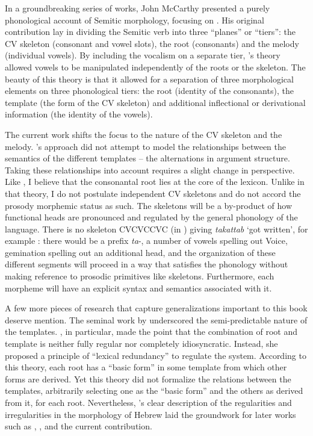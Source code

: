 \begin{exe}
\begin{xlist}
\begin{exe}
\begin{exe}
\begin{exe}
\begin{exe}
\begin{xlist}
\begin{exe}
\begin{xlist}
\begin{xlist}
\begin{xlist}
\begin{exe}
\begin{xlist}
In a groundbreaking series of works, John McCarthy presented a purely phonological account of Semitic morphology, focusing on  \citep{jjmcc79,jjmcc81,jjmcc89li,jjmccprince90}. His original contribution lay in dividing the Semitic verb into three ``planes'' or ``tiers'': the CV skeleton (consonant and vowel slots), the root (consonants) and the melody (individual vowels).
By including the vocalism on a separate tier, \citeauthor{jjmcc81}'s theory allowed vowels to be manipulated independently of the roots or the skeleton.
The beauty of this theory is that it allowed for a separation of three morphological elements on three phonological tiers: the root (identity of the consonants), the template (the form of the CV skeleton) and additional inflectional or derivational information (the identity of the vowels).

The current work shifts the focus to the nature of the CV skeleton and the melody. \citeauthor{jjmcc81}'s approach did not attempt to model the relationships between the semantics of the different templates -- the alternations in argument structure. 
Taking these relationships into account requires a slight change in perspective. Like \cite{jjmcc81}, I believe that the consonantal root lies at the core of the lexicon. Unlike in that theory, I do not postulate independent CV skeletons and do not accord the prosody morphemic status as such. The skeletons will be a by-product of how functional heads are pronounced and regulated by the general phonology of the language. There is no skeleton CVCVCCVC (in ) giving \emph{takattab} `got written', for example \citep[392]{jjmcc81}: there would be a prefix \emph{ta}-, a number of vowels spelling out Voice, gemination spelling out an additional head, and the organization of these different segments will proceed in a way that satisfies the phonology without making reference to prosodic primitives like skeletons. Furthermore, each morpheme will have an explicit syntax and semantics associated with it.

A few more pieces of research that capture generalizations important to this book deserve mention. The seminal work by \cite{berman78} underscored the semi-predictable nature of the templates. \citet[Ch.~3]{berman78}, in particular, made the point that the combination of root and template is neither fully regular nor completely idiosyncratic. Instead, she proposed a principle of ``lexical redundancy'' to regulate the system. According to this theory, each root has a ``basic form'' in some template from which other forms are derived. Yet this theory did not formalize the relations between the templates, arbitrarily selecting one as the ``basic form'' and the others as derived from it, for each root. Nevertheless, \citeauthor{berman78}'s clear description of the regularities and irregularities in the morphology of Hebrew laid the groundwork for later works such as \cite{doron03}, \cite{arad05}, \cite{borer13oup} and the current contribution.


\end{xlist}
\end{exe}
\end{xlist}
\end{xlist}
\end{xlist}
\end{exe}
\end{xlist}
\end{exe}
\end{exe}
\end{exe}
\end{exe}
\end{xlist}
\end{exe}
